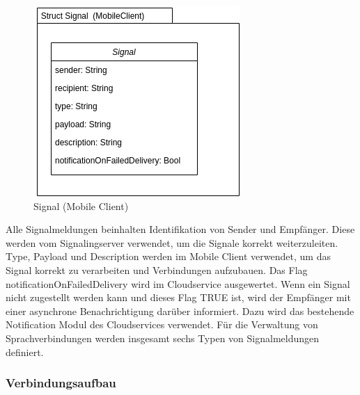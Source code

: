 \begin{figure}[h]
    \centering
    \begin{minipage}[b]{0.4\textwidth}
        \includegraphics[width=\textwidth]{graphics/diagramms/Class_Signal_V01}
        \caption{Signal (Mobile Client)}
    \end{minipage}
\end{figure}

Alle Signalmeldungen beinhalten Identifikation von Sender und Empfänger.
Diese werden vom Signalingserver verwendet, um die Signale korrekt weiterzuleiten.
Type, Payload und Description werden im Mobile Client verwendet, um das Signal korrekt zu verarbeiten und Verbindungen aufzubauen.
Das Flag notificationOnFailedDelivery wird im Cloudservice ausgewertet.
Wenn ein Signal nicht zugestellt werden kann und dieses Flag TRUE ist, wird der Empfänger mit einer asynchrone Benachrichtigung darüber informiert.
Dazu wird das bestehende Notification Modul des Cloudservices verwendet.
Für die Verwaltung von Sprachverbindungen werden insgesamt sechs Typen von Signalmeldungen definiert.
\clearpage
\subsubsection{Verbindungsaufbau}

